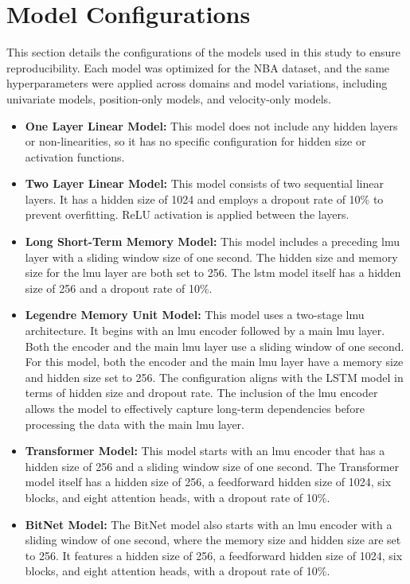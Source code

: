 \section{Model Configurations}
\label{sec:model_configs}

This section details the configurations of the models used in this study to ensure reproducibility. Each model was optimized for the NBA dataset, and the same hyperparameters were applied across domains and model variations, including univariate models, position-only models, and velocity-only models.

\begin{itemize}
    \item \textbf{One Layer Linear Model:} 
    This model does not include any hidden layers or non-linearities, so it has no specific configuration for hidden size or activation functions.
    
    \item \textbf{Two Layer Linear Model:} 
    This model consists of two sequential linear layers. It has a hidden size of 1024 and employs a dropout rate of 10\% to prevent overfitting. ReLU activation is applied between the layers.
    
    \item \textbf{Long Short-Term Memory Model:} 
    This model includes a preceding \gls{lmu} layer with a sliding window size of one second. The hidden size and memory size for the \gls{lmu} layer are both set to 256. The \gls{lstm} model itself has a hidden size of 256 and a dropout rate of 10\%.
    
    \item \textbf{Legendre Memory Unit Model:} 
    This model uses a two-stage \gls{lmu} architecture. It begins with an \gls{lmu} encoder followed by a main \gls{lmu} layer. Both the encoder and the main \gls{lmu} layer use a sliding window of one second. For this model, both the encoder and the main \gls{lmu} layer have a memory size and hidden size set to 256. The configuration aligns with the LSTM model in terms of hidden size and dropout rate. The inclusion of the \gls{lmu} encoder allows the model to effectively capture long-term dependencies before processing the data with the main \gls{lmu} layer.

    
    \item \textbf{Transformer Model:} 
    This model starts with an \gls{lmu} encoder that has a hidden size of 256 and a sliding window size of one second. The Transformer model itself has a hidden size of 256, a feedforward hidden size of 1024, six blocks, and eight attention heads, with a dropout rate of 10\%.
    
    \item \textbf{BitNet Model:} 
    The BitNet model also starts with an \gls{lmu} encoder with a sliding window of one second, where the memory size and hidden size are set to 256. It features a hidden size of 256, a feedforward hidden size of 1024, six blocks, and eight attention heads, with a dropout rate of 10\%.
\end{itemize}

